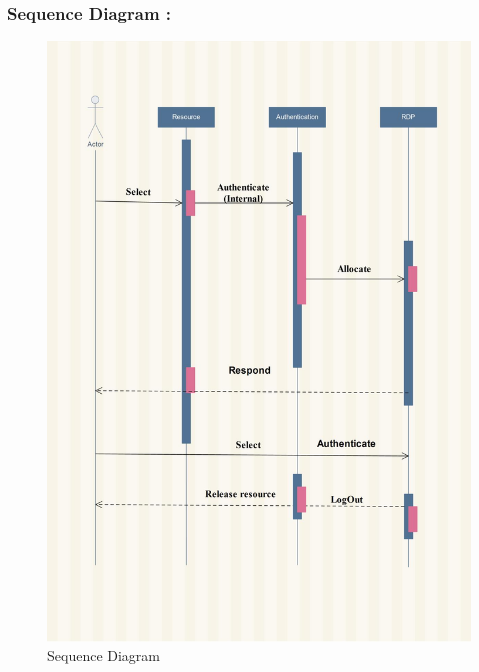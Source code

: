 \documentclass[12pt,a4paper,final,oneside]{report}
\begin{document}
	\subsubsection{Sequence Diagram :}
	\begin{figure}
		\centering
		\newpage \includegraphics[width=0.65\textheight,angle=0]
		{seq2.jpg}
		\caption{Sequence Diagram}
	\end{figure}
\end{document}
